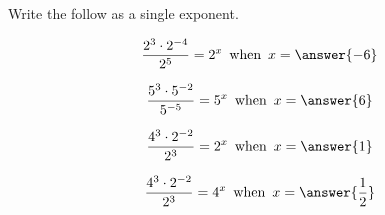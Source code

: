 \documentclass{ximera}
\author{Lee Wayand}
\begin{document}
\begin{exercise}






Write the follow as a single exponent.

\begin{question}  



\[
\frac{2^3 \cdot 2^{-4}}{2^5} = 2^x \, \text{ when } \, x = \answer{-6}
\]


\end{question}






\begin{question}  



\[
\frac{5^3 \cdot 5^{-2}}{5^{-5}} = 5^x \, \text{ when } \, x = \answer{6}
\]


\end{question}






\begin{question}  



\[
\frac{4^3 \cdot 2^{-2}}{2^3} = 2^x \, \text{ when } \, x = \answer{1}
\]


\end{question}







\begin{question}  



\[
\frac{4^3 \cdot 2^{-2}}{2^3} = 4^x \, \text{ when } \, x = \answer{\frac{1}{2}}
\]


\end{question}










\end{exercise}
\end{document}
